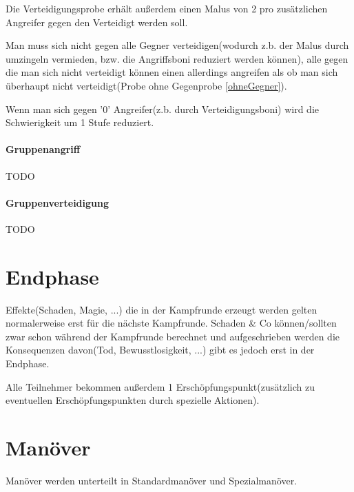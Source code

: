 Die Verteidigungsprobe erhält außerdem einen Malus von 2 pro zusätzlichen Angreifer gegen den Verteidigt werden soll.

Man muss sich nicht gegen alle Gegner verteidigen(wodurch z.b. der Malus durch umzingeln vermieden, bzw. die Angriffsboni reduziert werden können), alle gegen die man sich nicht verteidigt können einen allerdings angreifen als ob man sich überhaupt nicht verteidigt(Probe ohne Gegenprobe \ref{ohneGegner}).

Wenn man sich gegen '0' Angreifer(z.b. durch Verteidigungsboni) wird die Schwierigkeit um 1 Stufe reduziert.

\paragraph{Gruppenangriff}
TODO
\paragraph{Gruppenverteidigung}
TODO


\section{Endphase}
Effekte(Schaden, Magie, ...) die in der Kampfrunde erzeugt werden gelten normalerweise erst für die nächste Kampfrunde. Schaden \& Co können/sollten zwar schon während der Kampfrunde berechnet und aufgeschrieben werden die Konsequenzen davon(Tod, Bewusstlosigkeit, ...) gibt es jedoch erst in der Endphase.

Alle Teilnehmer bekommen außerdem 1 Erschöpfungspunkt(zusätzlich zu eventuellen Erschöpfungspunkten durch spezielle Aktionen).

\section{Manöver}
\label{SupportKampfaktionen}
Manöver werden unterteilt in Standardmanöver und Spezialmanöver.

